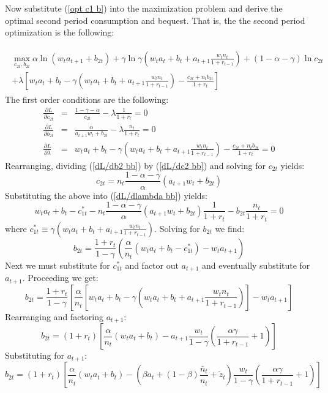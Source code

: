 \documentclass{article}
\begin{document}
Now substitute (\ref{opt c1 b}) into the maximization problem and derive the optimal second period consumption and bequest.  That is, the the second period optimization is the following:

\begin{gather}
\begin{split}
\max_{c_{2t}, b_{2t}}\alpha \ln (w_t a_{t+1} + b_{2t})
+ \gamma \ln \gamma(w_t a_t + b_t + a_{t+1}\frac{w_t n_t}{1+r_{t-1}})
+ (1-\alpha-\gamma) \ln c_{2t}\\
+ \lambda [ w_t a_t + b_t - \gamma(w_t a_t + b_t + a_{t+1}\frac{w_t n_t}{1+r_{t-1}}) - \frac{c_{2t} + n_t b_{2t}}{1+r_t}]
\end{split}
\end{gather}
The first order conditions are the following:
\begin{eqnarray}
\frac{\partial L}{\partial c_{2t}} &=& \frac{1-\gamma-\alpha}{c_{2t}} - \lambda\frac{1}{1+r_t}=0 \label{dL/dc2 bb} \\
\frac{\partial L}{\partial b_{2t}} &=& \frac{\alpha}{a_{t+1}w_t+b_{2t}}-\lambda \frac{n_t}{1+r_t}=0\label{dL/db2 bb}\\
\frac{\partial L}{\partial \lambda} &=& w_t a_t + b_t - \gamma(w_t a_t + b_t + a_{t+1}\frac{w_t n_t}{1+r_{t-1}}) - \frac{c_{2t} + n_t b_{2t}}{1+r_t}=0 \label{dL/dlambda bb}
\end{eqnarray}
Rearranging, dividing (\ref{dL/db2 bb}) by (\ref{dL/dc2 bb}) and solving for $c_{2t}$ yields:
\begin{equation}
c_{2t} = n_t\frac{1-\alpha - \gamma}{\alpha}(a_{t+1} w_t +b_{2t})
\end{equation}
Substituting the above into (\ref{dL/dlambda bb}) yields:
\begin{equation*}
w_t a_t + b_t - c^{*}_{1t} - n_t\frac{1-\alpha - \gamma}{\alpha}(a_{t+1} w_t +b_{2t})\frac{1}{1+r_t}-b_{2t}\frac{n_t}{1+r_t}=0
\end{equation*}
where $c^{*}_{1t}\equiv\gamma(w_t a_t + b_t + a_{t+1}\frac{w_t n_t}{1+r_{t-1}})$.  Solving for $b_{2t}$ we find:
\begin{equation*}
b_{2t} = \frac{1+r_t}{1-\gamma}(\frac{\alpha}{n_t}(w_t a_t +b_t - c^{*}_{1t})-w_t a_{t+1})
\end{equation*}
Next we must substitute for $c^{*}_{1t}$ and factor out $a_{t+1}$ and eventually substitute for $a_{t+1}$.  Proceeding we get:
\begin{equation*}
b_{2t} = \frac{1+r_t}{1-\gamma}[ \frac{\alpha}{n_t}[ w_t a_t +b_t - \gamma(w_t a_t + b_t + a_{t+1}\frac{w_t n_t}{1+r_{t-1}}) ]-w_t a_{t+1} ]
\end{equation*}
Rearranging and factoring $a_{t+1}$:
\begin{equation*}
b_{2t} = (1+{r_t})[\frac{\alpha}{n_t}(w_t a_t + b_t)-a_{t+1}\frac{w_t}{1-\gamma}(\frac{\alpha\gamma}{1+r_{t-1}} +1) ]
\end{equation*}
Substituting for $a_{t+1}$:
\begin{equation*}
b_{2t} = (1+{r_t})[\frac{\alpha}{n_t}(w_t a_t + b_t)- (\beta a_{t} + (1-\beta)\frac{\bar{n}_{t}}{n_{t}} + \tilde{z}_{t}) \frac{w_t}{1-\gamma}(\frac{\alpha\gamma}{1+r_{t-1}} +1) ]
\end{equation*}
\end{document}
